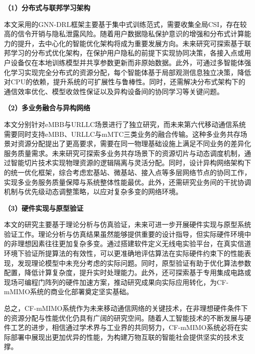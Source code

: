 \textbf{（1）分布式与联邦学习架构}

本文采用的GNN-DRL框架主要基于集中式训练范式，需要收集全局CSI，存在较高的信令开销与隐私泄露风险。随着用户数据隐私保护意识的增强和分布式计算能力的提升，去中心化的智能优化架构将成为重要发展方向。未来研究可探索基于联邦学习的分布式优化架构，在保护用户隐私的前提下实现协同决策，各接入点或用户设备仅在本地训练模型并共享参数更新而非原始数据。此外，可通过多智能体强化学习实现完全分布式的资源分配，每个智能体基于局部观测信息独立决策，降低对CPU的依赖，提升系统的可扩展性与鲁棒性。同时，还需解决分布式架构下的通信效率优化、模型收敛性保证以及异构设备间的协同学习等关键问题。

\textbf{（2）多业务融合与异构网络}

本文分别针对eMBB与URLLC场景进行了独立研究，而未来第六代移动通信系统需要同时支持eMBB、URLLC与mMTC三类业务的融合传输。这种多业务共存场景对资源分配提出了更高要求，需要在同一物理基础设施上满足不同业务的差异化服务质量需求。未来研究可探索多业务共存场景下的资源切片与动态调度机制，通过智能切片技术实现物理资源的逻辑隔离与灵活分配。同时，设计异构网络架构下的统一优化框架，综合考虑宏基站、微基站、接入点等多层网络节点的协同工作，实现多业务服务质量保障与系统整体性能最优。此外，还需研究业务间的干扰协调机制与优先级动态调整策略，以应对复杂多变的网络环境。

\textbf{（3）硬件实现与原型验证}

本文的研究主要基于理论分析与仿真验证，未来可进一步开展硬件实现与原型系统验证工作。理论分析与仿真结果虽然能够提供重要的设计指导，但实际硬件环境中的非理想因素往往更加复杂多变。通过搭建软件定义无线电实验平台，在真实信道环境下验证所提算法的有效性，可以更准确地评估算法在实际硬件约束下的性能表现，发现理论模型中未充分考虑的实际问题。同时，原型验证有助于优化算法参数配置，降低计算复杂度，提升实时处理能力。此外，还可探索基于专用集成电路或现场可编程门阵列的硬件加速方案，推动研究成果向实际应用转化，为CF-mMIMO系统的商业化部署奠定坚实基础。

总之，CF-mMIMO系统作为未来移动通信网络的关键技术，在非理想硬件条件下的资源分配与性能优化仍具有广阔的研究空间。随着人工智能技术的不断发展与硬件工艺的进步，相信通过学术界与工业界的共同努力，CF-mMIMO系统必将在实际部署中展现出更加优异的性能，为构建万物互联的智能社会提供坚实的技术支撑。
